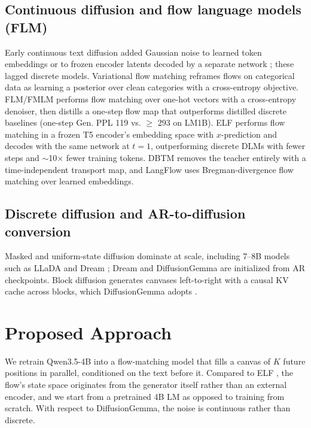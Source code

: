 \documentclass[11pt]{article}
\begin{document}
\subsection{Continuous diffusion and flow language models (FLM)}
Early continuous text diffusion added Gaussian noise to learned token embeddings \citep{li2022diffusionlm,dieleman2022cdcd,gulrajani2023plaid} or to frozen encoder latents decoded by a separate network \citep{lovelace2023ld4lg}; these lagged discrete models. Variational flow matching \citep{eijkelboom2024vfm} reframes flows on categorical data as learning a posterior over clean categories with a cross-entropy objective. FLM/FMLM \citep{lee2026flm} performs flow matching over one-hot vectors with a cross-entropy denoiser, then distills a one-step flow map that outperforms distilled discrete baselines (one-step Gen. PPL 119 vs. $\ge$ 293 on LM1B). ELF \citep{hu2026elf} performs flow matching in a frozen T5 encoder's embedding space with $x$-prediction and decodes with the same network at $t=1$, outperforming discrete DLMs with fewer steps and $\sim$10$\times$ fewer training tokens. DBTM \citep{tang2026dbtm} removes the teacher entirely with a time-independent transport map, and LangFlow \citep{chen2026langflow} uses Bregman-divergence flow matching over learned embeddings.

\subsection{Discrete diffusion and AR-to-diffusion conversion}
Masked and uniform-state diffusion \citep{sahoo2024mdlm,lou2024sedd,sahoo2025duo} dominate at scale, including 7--8B models such as LLaDA and Dream \citep{nie2025llada,ye2025dream}; Dream and DiffusionGemma are initialized from AR checkpoints. Block diffusion \citep{arriola2025block} generates canvases left-to-right with a causal KV cache across blocks, which DiffusionGemma adopts \citep{grootendorst2026visual}.

\section{Proposed Approach}

We retrain Qwen3.5-4B \citep{qwen2026qwen35} into a flow-matching model that fills a canvas of $K$ future positions in parallel, conditioned on the text before it. Compared to ELF \citep{hu2026elf}, the flow's state space originates from the generator itself rather than an external encoder, and we start from a pretrained 4B LM as opposed to training from scratch. With respect to DiffusionGemma, the noise is continuous rather than discrete.
\end{document}
